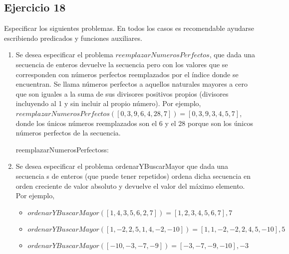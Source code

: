 \subsection{Ejercicio 18}
Especificar los siguientes problemas. En todos los casos es recomendable ayudarse escribiendo predicados y funciones auxiliares.

\begin{enumerate}[label=\alph*)]
      \item Se desea especificar el problema $reemplazarNumerosPerfectos$, que dada una secuencia de enteros devuelve la secuencia pero con los valores que se corresponden con números perfectos reemplazados por el índice donde se encuentran. Se llama números perfectos a aquellos naturales mayores a cero que son iguales a la suma de sus divisores positivos propios (divisores incluyendo al 1 y sin incluir al propio número). Por ejemplo, $reemplazarNumerosPerfectos([0, 3, 9, 6, 4, 28, 7]) = [0, 3, 9, 3, 4, 5, 7]$, donde los únicos números reemplazados son el 6 y el 28 porque son los únicos números perfectos de la secuencia.

            \begin{proc}{reemplazarNumerosPerfectos}{\In s: \TLista{\ent}}{\TLista{\ent}}


            \end{proc}

      \item Se desea especificar el problema ordenarYBuscarMayor que dada una secuencia s de enteros (que puede tener repetidos) ordena dicha secuencia en orden creciente de valor absoluto y devuelve el valor del máximo elemento. Por ejemplo,

            \begin{itemize}
                  \item $ordenarYBuscarMayor([1,4,3,5,6,2,7]) = [1,2,3,4,5,6,7], 7$
                  \item $ordenarYBuscarMayor([1,-2,2,5,1,4,-2,-10]) = [1,1,-2,-2,2,4,5,-10], 5$
                  \item $ordenarYBuscarMayor([-10,-3,-7,-9]) = [-3,-7,-9,-10], -3$
            \end{itemize}


\end{enumerate}
